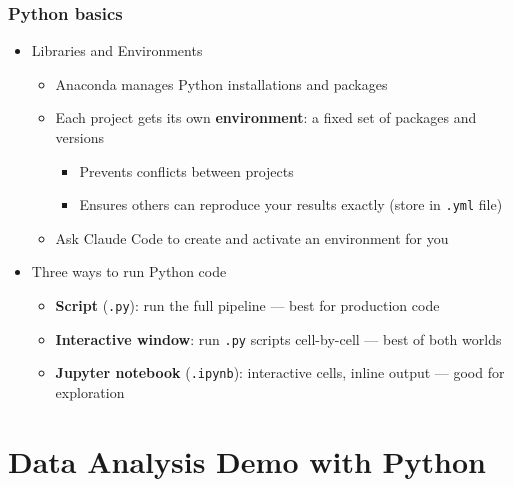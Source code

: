 \documentclass[aspectratio=169, 12pt]{beamer}
\begin{document}
\begin{frame}
\frametitle{Python basics}
\begin{itemize}
    \item Libraries and Environments
    \begin{itemize}
        \item Anaconda manages Python installations and packages
        \item Each project gets its own \textbf{environment}: a fixed set of packages and versions
            \begin{itemize}
                \item[$\circ$] Prevents conflicts between projects
                \item[$\circ$] Ensures others can reproduce your results exactly (store in \texttt{.yml} file)
            \end{itemize}
        \item Ask Claude Code to create and activate an environment for you
    \end{itemize}

    \item Three ways to run Python code
        \begin{itemize}
            \item[$\circ$] \textbf{Script} (\texttt{.py}): run the full pipeline --- best for production code
            \item[$\circ$] \textbf{Interactive window}: run \texttt{.py} scripts cell-by-cell --- best of both worlds
            \item[$\circ$] \textbf{Jupyter notebook} (\texttt{.ipynb}): interactive cells, inline output --- good for exploration
        \end{itemize}
\end{itemize}
\end{frame}





\section{Data Analysis Demo with Python \vspace{0.3in}}
\end{document}
